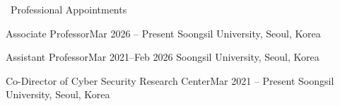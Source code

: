 \documentclass{resume} %
\begin{document}
\begin{rSection}{\faGenderless~Professional Appointments}
    \begin{rSubsection2}
        {Associate Professor}{Mar 2026 -- Present}
        {Soongsil University, Seoul, Korea}{}
    \end{rSubsection2}
    \vspace{-2mm}
	\begin{rSubsection2}
        {Assistant Professor}{Mar 2021--Feb 2026}
        {Soongsil University, Seoul, Korea}{}
	\end{rSubsection2}
    \vspace{-2mm}
    \begin{rSubsection2}
        {Co-Director of Cyber Security Research Center}{Mar 2021 -- Present}
        {Soongsil University, Seoul, Korea}{}
    \end{rSubsection2}
\end{rSection}





\end{document}
